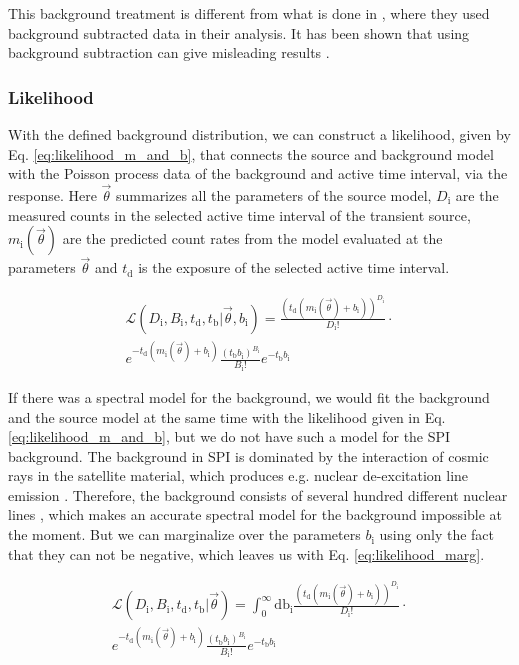 \documentclass[twocolumn,traditabstract]{aa}
\begin{document}
This background treatment is different from what is done in \citet{Bosnjak-2014}, where they used background subtracted data in their analysis. It has been shown that using background subtraction can give misleading results \citep[e.g.][]{Greiner-2016}.


\subsubsection{Likelihood}

With the defined background distribution, we can construct a likelihood, given by Eq. \ref{eq:likelihood_m_and_b}, that connects the source and background model with the Poisson process data of the background and active time interval, via the response. Here $\vec{\theta}$ summarizes all the parameters of the source model, $D_{\mathrm{i}}$ are the measured counts in the selected active time interval of the transient source, $m_{\mathrm{i}}(\vec{\theta})$ are the predicted count rates from the model evaluated at the parameters $\vec{\theta}$ and $t_{\mathrm{d}}$ is the exposure of the selected active time interval.

\begin{multline}
	\mathcal{L}(D_{\mathrm{i}}, B_{\mathrm{i}},t_{\mathrm{d}},t_{\mathrm{b}}|\vec{\theta}, b_{\mathrm{i}}) = \frac{(t_{\mathrm{d}}(m_{\mathrm{i}}(\vec{\theta})+ b_{\mathrm{i}}))^{D_{\mathrm{i}}}}{D_{\mathrm{i}}!}\cdot \\
  e^{-t_{\mathrm{d}}(m_{\mathrm{i}}(\vec{\theta})+b_{\mathrm{i}})}\frac{(t_{\mathrm{b}} b_{\mathrm{i}})^{B_{\mathrm{i}}}}{B_{\mathrm{i}}!} e^{-t_{\mathrm{b}} b_{\mathrm{i}}}
  \label{eq:likelihood_m_and_b}
\end{multline}

\noindent
If there was a spectral model for the background, we would fit the background and the source model at the same time with the likelihood given in Eq. \ref{eq:likelihood_m_and_b}, but we do not have such a model for the SPI background. The background in SPI is dominated by the interaction of cosmic rays in the satellite material, which produces e.g. nuclear de-excitation line emission \citep{spi_bkg}. Therefore, the background consists of several hundred different nuclear lines \citep{spi_bkg}, which makes an accurate spectral model for the background impossible at the moment. But we can marginalize over the parameters $b_{\mathrm{i}}$ using only the fact that they can not be negative, which leaves us with Eq. \ref{eq:likelihood_marg}.

\begin{multline}
	\mathcal{L}(D_{\mathrm{i}}, B_{\mathrm{i}},t_{\mathrm{d}},t_{\mathrm{b}}|\vec{\theta}) = \int_{0}^{\infty}\textrm{db}_{\mathrm{i}}\frac{(t_{\mathrm{d}}(m_{\mathrm{i}}(\vec{\theta})+ b_{\mathrm{i}}))^{D_{\mathrm{i}}}}{D_{\mathrm{i}}!}\cdot\\
  e^{-t_{\mathrm{d}}(m_{\mathrm{i}}(\vec{\theta})+b_{\mathrm{i}})} \frac{(t_{\mathrm{b}} b_{\mathrm{i}})^{B_{\mathrm{i}}}}{B_{\mathrm{i}}!} e^{-t_{\mathrm{b}}b_{\mathrm{i}}}
  \label{eq:likelihood_marg}
\end{multline}
\end{document}
